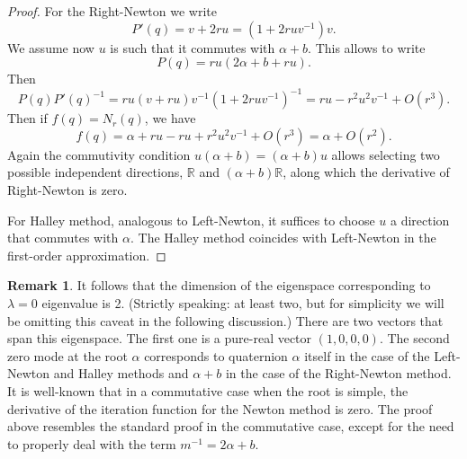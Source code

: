 \documentclass{article}
\theoremstyle{definition}
\newtheorem{remark}{Remark}
\begin{document}
\begin{proof}
For the Right-Newton we write
\begin{equation}
P'(q)=v+ 2r u= (1+ 2ruv^{-1})v.
\end{equation}
We assume now $u$ is such that it commutes with $\alpha +b$. This allows to write
\begin{equation}
P(q)=ru(2\alpha +b + r u).
\end{equation}
Then
\begin{equation}
P(q) P'(q)^{-1}= ru(v+ru)v^{-1}(1+2ruv^{-1})^{-1}= ru-r^2 u^2 v^{-1}+
O(r^3).
\end{equation}
Then if $f(q)=N_r(q)$, we have
\begin{equation}
f(q)= \alpha + r u-ru+r^2u^2v^{-1}+O(r^3)= \alpha + O(r^2).
\end{equation}
Again the commutivity  condition $u(\alpha+b)=(\alpha+ b)u$ allows selecting two possible independent directions,  $\mathbb{R}$ and $(\alpha+b) \mathbb{R}$, along which the derivative of Right-Newton is zero.

For Halley method, analogous to Left-Newton, it suffices to choose $u$ a direction that commutes with $\alpha$.  The Halley method coincides with Left-Newton in the first-order approximation.
\end{proof}

\begin{remark}
It follows that the dimension of the eigenspace corresponding to $\lambda=0$ eigenvalue is 2. (Strictly speaking: at least two, but for simplicity we will be omitting this caveat in the following discussion.) There are two vectors that span this eigenspace. The first one is a pure-real vector $(1,0,0,0)$. The second zero mode at the root $\alpha$ corresponds to quaternion $\alpha$ itself in the case of the Left-Newton and Halley methods and $\alpha+b$ in the case of the Right-Newton method. It is well-known that in a commutative case when the root is simple, the derivative of the iteration function for the Newton method is zero. The proof above resembles the standard proof in the commutative case, except for the need to properly deal with the term $m^{-1} = 2\alpha+b$.
\end{remark}
\end{document}
